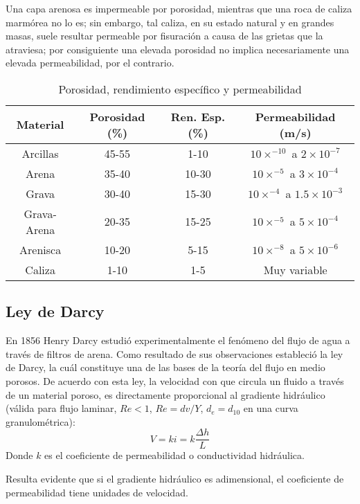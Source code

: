 Una capa arenosa es impermeable por porosidad, mientras que una roca de caliza marmórea no lo es; sin embargo, tal caliza, en su estado natural y en grandes masas, suele resultar permeable por fisuración a causa de las grietas que la atraviesa; por consiguiente una elevada porosidad no implica necesariamente una elevada permeabilidad, por el contrario.
\begin{table}[h!]
    \centering
    \begin{tabular}{@{}cccc@{}}
    \toprule
    Material    & Porosidad (\%) & Ren. Esp. (\%) & Permeabilidad (m/s)                   \\ \midrule
    Arcillas     & 45-55          & 1-10           & $10\times^{-10}$ a $2\times 10^{-7}$  \\
    Arena       & 35-40          & 10-30          & $10\times^{-5}$ a $3\times 10^{-4}$   \\
    Grava       & 30-40          & 15-30          & $10\times^{-4}$ a $1.5\times 10^{-3}$ \\
    Grava-Arena & 20-35          & 15-25          & $10\times^{-5}$ a $5\times 10^{-4}$   \\
    Arenisca    & 10-20          & 5-15           & $10\times^{-8}$ a $5\times 10^{-6}$   \\
    Caliza      & 1-10           & 1-5            & Muy variable                          \\ \bottomrule
    \end{tabular}
    \caption{Porosidad, rendimiento específico y permeabilidad}
    \label{tabgh222}
\end{table}
\subsection{Ley de Darcy}
En 1856 Henry Darcy estudió experimentalmente el fenómeno del flujo de agua a través de filtros de arena. Como resultado de sus observaciones estableció la ley de Darcy, la cuál constituye una de las bases de la teoría del flujo en medio porosos. De acuerdo con esta ley, la velocidad con que circula un fluido a través de un material poroso, es directamente proporcional al gradiente hidráulico (válida para flujo laminar, $Re<1$, $Re=dv/Y$, $d_e=d_{10}$ en una curva granulométrica):
\begin{equation}
    V= ki= k \frac{\Delta h}{L}
\end{equation}
Donde $k$ es el coeficiente de permeabilidad o conductividad hidráulica.

Resulta evidente que si el gradiente hidráulico es adimensional, el coeficiente de permeabilidad tiene unidades de velocidad.

